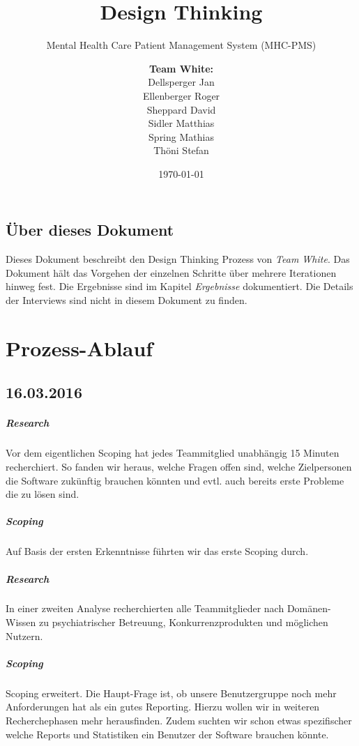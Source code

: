 \documentclass[a4paper]{scrreprt}
\title{Design Thinking}
\subtitle{Mental Health Care Patient Management System (MHC-PMS)}
\author{
\begin{tabular}{l}
\normalfont\bfseries{Team White:}\\
Dellsperger Jan\\
Ellenberger Roger\\
Sheppard David\\
Sidler Matthias\\
Spring Mathias\\
Thöni Stefan
\end{tabular}
}
\date{\today}
\begin{document}
\begin{titlepage}
	\maketitle
\end{titlepage}



\section*{Über dieses Dokument}
Dieses Dokument beschreibt den Design Thinking Prozess von \textit{Team White}. Das Dokument hält das Vorgehen der einzelnen Schritte über mehrere Iterationen hinweg fest. Die Ergebnisse sind im Kapitel \textit{Ergebnisse} dokumentiert. Die Details der Interviews sind nicht in diesem Dokument zu finden.

\chapter{Prozess-Ablauf}
\section*{16.03.2016}
\paragraph{Research}
Vor dem eigentlichen Scoping hat jedes Teammitglied unabhängig 15 Minuten recherchiert. So fanden wir heraus, welche Fragen offen sind, welche Zielpersonen die Software zukünftig brauchen könnten und evtl. auch bereits erste Probleme die zu lösen sind.


\paragraph{Scoping}
Auf Basis der ersten Erkenntnisse führten wir das erste Scoping durch.


\paragraph{Research}
In einer zweiten Analyse recherchierten alle Teammitglieder nach Domänen-Wissen zu psychiatrischer Betreuung, Konkurrenzprodukten und möglichen Nutzern.


\paragraph{Scoping}
Scoping erweitert. Die Haupt-Frage ist, ob unsere Benutzergruppe noch mehr Anforderungen hat als ein gutes Reporting. Hierzu wollen wir in weiteren Recherchephasen mehr herausfinden. Zudem suchten wir schon etwas spezifischer welche Reports und Statistiken ein Benutzer der Software brauchen könnte.
\end{document}
